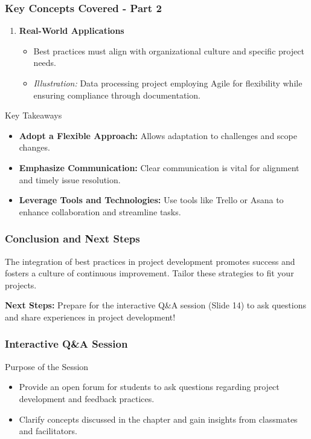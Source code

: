 \documentclass[aspectratio=169]{beamer}
\begin{document}
\begin{frame}[fragile]
    \frametitle{Key Concepts Covered - Part 2}
    \begin{enumerate}[resume]
        \item \textbf{Real-World Applications}
        \begin{itemize}
            \item Best practices must align with organizational culture and specific project needs.
            \item \textit{Illustration:} Data processing project employing Agile for flexibility while ensuring compliance through documentation.
        \end{itemize}
    \end{enumerate}
    
    \begin{block}{Key Takeaways}
        \begin{itemize}
            \item \textbf{Adopt a Flexible Approach:} Allows adaptation to challenges and scope changes.
            \item \textbf{Emphasize Communication:} Clear communication is vital for alignment and timely issue resolution.
            \item \textbf{Leverage Tools and Technologies:} Use tools like Trello or Asana to enhance collaboration and streamline tasks.
        \end{itemize}
    \end{block}
\end{frame}

\begin{frame}[fragile]
    \frametitle{Conclusion and Next Steps}
    The integration of best practices in project development promotes success and fosters a culture of continuous improvement. Tailor these strategies to fit your projects.

    \textbf{Next Steps:} Prepare for the interactive Q\&A session (Slide 14) to ask questions and share experiences in project development!
\end{frame}

\begin{frame}[fragile]
    \frametitle{Interactive Q\&A Session}
    \begin{block}{Purpose of the Session}
        \begin{itemize}
            \item Provide an open forum for students to ask questions regarding project development and feedback practices.
            \item Clarify concepts discussed in the chapter and gain insights from classmates and facilitators.
        \end{itemize}
    \end{block}
\end{frame}
\end{document}
